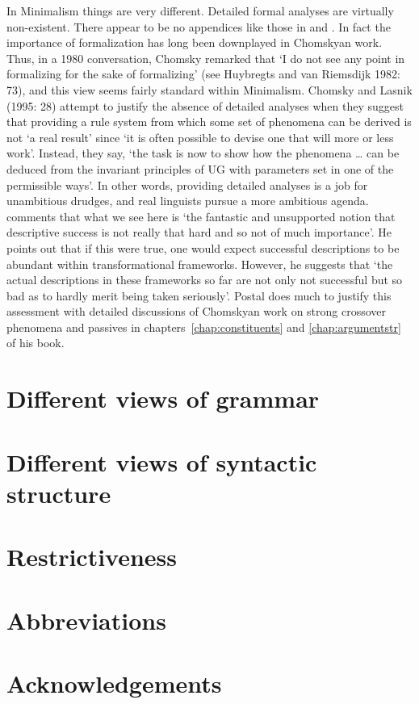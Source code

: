 \documentclass[output=paper]{langsci/langscibook}
\begin{document}
In Minimalism things are very different. Detailed formal analyses are virtually non-existent. There appear to be no appendices like those in \citet{Sag97a} and \citet{GSag2000a-u}. In fact the importance of formalization has long been downplayed in Chomskyan work. Thus, in a 1980 conversation, Chomsky remarked that `I do not see any point in formalizing for the sake of formalizing' (see Huybregts and van Riemsdijk 1982: 73), and this view seems fairly standard within Minimalism. Chomsky and Lasnik (1995: 28) attempt to justify the absence of detailed analyses when they suggest that providing a rule system from which some set of phenomena can be derived is not `a real result' since `it is often possible to devise one that will more or less work'. Instead, they say, `the task is now to show how the phenomena \ldots{} can be deduced from the invariant principles of UG with parameters set in one of the permissible ways'. In other words, providing detailed analyses is a job for unambitious drudges, and real linguists pursue a more ambitious agenda. \citet[5]{Postal2004a-u} comments that what we see here is `the fantastic and unsupported notion that descriptive success is not really that hard and so not of much importance'. He points out that if this were true, one would expect successful descriptions to be abundant within transformational frameworks. However, he suggests that `the actual descriptions in these frameworks so far are not only not successful but so bad as to hardly merit being taken seriously'. Postal does much to justify this assessment with detailed discussions of Chomskyan work on strong crossover phenomena and passives in chapters~\ref{chap:constituents} and \ref{chap:argumentstr} of his book.

\section{Different views of grammar}
\label{sec:30-3}

\section{Different views of syntactic structure}
\label{sec:30-4}

\section{Restrictiveness}
\label{sec:30-5}

\section*{Abbreviations}
\section*{Acknowledgements}

\printbibliography[heading=subbibliography,notkeyword=this] 
\end{document}
